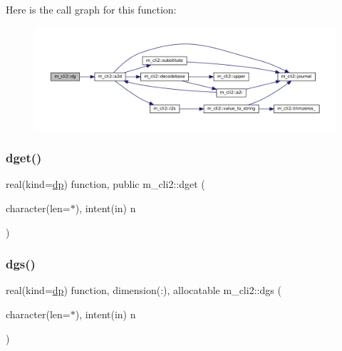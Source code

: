 Here is the call graph for this function\+:\nopagebreak
\begin{figure}[H]
\begin{center}
\leavevmode
\includegraphics[width=350pt]{namespacem__cli2_a06ddc2533e5122b8f898bae7db0fea87_cgraph}
\end{center}
\end{figure}
\mbox{\label{namespacem__cli2_abb63058af19a47e19a78567c4a320c16}} 
\subsubsection{\texorpdfstring{dget()}{dget()}}
{\footnotesize\ttfamily real(kind=\mbox{\hyperlink{namespacem__cli2_acf83f1963cf6a56ad0221cfcf5402440}{dp}}) function, public m\+\_\+cli2\+::dget (\begin{DoxyParamCaption}\item[{character(len=$\ast$), intent(in)}]{n }\end{DoxyParamCaption})}

\mbox{\label{namespacem__cli2_a84bc83f5e8ec87f4d691e40df7569c83}} 
\subsubsection{\texorpdfstring{dgs()}{dgs()}}
{\footnotesize\ttfamily real(kind=\mbox{\hyperlink{namespacem__cli2_acf83f1963cf6a56ad0221cfcf5402440}{dp}}) function, dimension(\+:), allocatable m\+\_\+cli2\+::dgs (\begin{DoxyParamCaption}\item[{character(len=$\ast$), intent(in)}]{n }\end{DoxyParamCaption})\hspace{0.3cm}{\ttfamily [private]}}

\mbox{\label{namespacem__cli2_a601a06b7038b524abababc8d437ee823}} 
